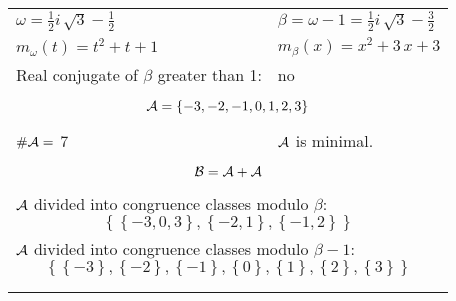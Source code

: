 \begin{exmp}
\label{ex:compareAB}


\rule{0cm}{0cm}

\begin{tabular}{ll}
$\omega=  \frac{1}{2} i \, \sqrt{3} - \frac{1}{2} $  & $\beta= \omega - 1 = \frac{1}{2} i \, \sqrt{3} - \frac{3}{2} $\\
$m_\omega(t)=  t^{2} + t + 1 $  & $m_\beta(x)=  x^{2} + 3 \, x + 3 $\\
Real conjugate of $\beta$ greater than 1:   &  no \\ \hline
\multicolumn{2}{l}{\begin{minipage}{\textwidth}\begin{dmath*}\A = \left\{-3, -2, -1, 0, 1, 2, 3\right\}  \end{dmath*}\end{minipage} }\\
$\#\mathcal{A}= $ 7 $ $ & $\mathcal{A}$ is minimal. \\
\multicolumn{2}{l}{\begin{minipage}{\textwidth}\begin{dmath*}\B =\A+\A \end{dmath*}\end{minipage} }\\[10pt]
\multicolumn{2}{l}{\begin{minipage}{\textwidth}$\mathcal{A}$ divided into congruence classes modulo $\beta$: \begin{dmath*} \left\{\left\{-3, 0, 3\right\}, \left\{-2, 1\right\}, \left\{-1, 2\right\}\right\}  \end{dmath*}\end{minipage} }\\[10pt]
\multicolumn{2}{l}{\begin{minipage}{\textwidth}$\mathcal{A}$ divided into congruence classes modulo $\beta-1$: \begin{dmath*} \left\{\left\{-3\right\}, \left\{-2\right\}, \left\{-1\right\}, \left\{0\right\}, \left\{1\right\}, \left\{2\right\}, \left\{3\right\}\right\}  \end{dmath*}\end{minipage} }\\
 & \\ \hline
 & \\
\end{tabular}


\end{exmp}
